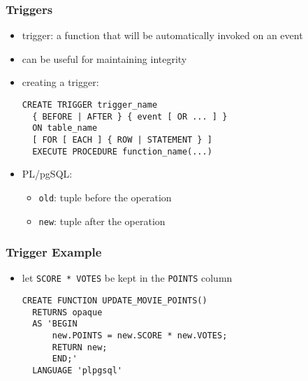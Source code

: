 \documentclass[dvipsnames]{beamer}
\theoremstyle{plain}
\begin{document}
\begin{frame}[fragile]
  \frametitle{Triggers}

  \begin{itemize}
    \item \alert{trigger}: a function that will be automatically invoked
      on an event
    \item can be useful for maintaining integrity

    \pause
    \medskip
    \item creating a trigger:
    \smallskip
    \begin{lstlisting}
CREATE TRIGGER trigger_name
  { BEFORE | AFTER } { event [ OR ... ] }
  ON table_name
  [ FOR [ EACH ] { ROW | STATEMENT } ]
  EXECUTE PROCEDURE function_name(...)
    \end{lstlisting}

    \item PL/pgSQL:
    \begin{itemize}
      \item \lstinline!old!: tuple before the operation
      \item \lstinline!new!: tuple after the operation
    \end{itemize}
  \end{itemize}
\end{frame}

\begin{frame}[fragile]
  \frametitle{Trigger Example}

  \begin{itemize}
    \item let \lstinline!SCORE * VOTES! be kept in the \lstinline!POINTS! column

    \medskip
    \begin{lstlisting}
CREATE FUNCTION UPDATE_MOVIE_POINTS()
  RETURNS opaque
  AS 'BEGIN
      new.POINTS = new.SCORE * new.VOTES;
      RETURN new;
      END;'
  LANGUAGE 'plpgsql'
    \end{lstlisting}
  \end{itemize}
\end{frame}
\end{document}

